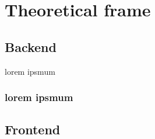 \chapter{Theoretical frame}
\label{chap:ch1}

\section{Backend}

\par lorem ipsmum

\subsection{lorem ipsmum}



\section{Frontend}
